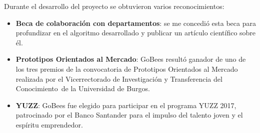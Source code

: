 Durante el desarrollo del proyecto se obtuvieron varios reconocimientos:

\begin{itemize}
\tightlist
\item
  \textbf{Beca de colaboración con departamentos}: se me concedió esta
  beca para profundizar en el algoritmo desarrollado y publicar un
  artículo científico sobre él.
\item
  \textbf{Prototipos Orientados al Mercado}: GoBees resultó ganador de
  uno de los tres premios de la convocatoria de Prototipos Orientados al
  Mercado realizada por el Vicerrectorado de Investigación y
  Transferencia del Conocimiento~de la Universidad de Burgos.
\item
  \textbf{YUZZ}: GoBees fue elegido para participar en el programa YUZZ
  2017, patrocinado por el Banco Santander para el impulso del talento
  joven y el espíritu emprendedor.
\end{itemize}
